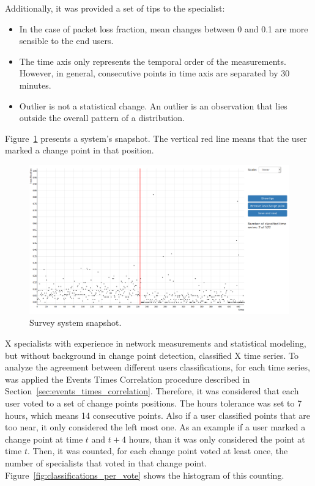 Additionally, it was provided a set of tips to the specialist:

\begin{itemize}
    \item In the case of packet loss fraction, mean changes between 0 and 0.1
    are more sensible to the end users.
    \item The time axis only represents the temporal order of the measurements.
    However, in general, consecutive points in time axis are separated by 30
    minutes.
    \item Outlier is not a statistical change. An outlier is an observation that
    lies outside the overall pattern of a distribution.
\end{itemize}

Figure~\ref{fig:survey_system} presents a system's snapshot.
The vertical red line means that the user marked a change point in that
position.

\begin{figure}[H]
    \centering
    \includegraphics[width=0.9\linewidth]{./figures/methodology/supervised_learning_try/survey_system.png}
    \caption{Survey system snapshot.}
\label{fig:survey_system}
\end{figure}%

X specialists with experience in network measurements and statistical
modeling, but without background in change point detection, classified X time
series.
To analyze the agreement between different users classifications,
for each time series, was applied the Events Times Correlation procedure
described in Section~\ref{sec:events_times_correlation}. Therefore, it was
considered that each user voted to a set of change points positions.
The hours tolerance was set to 7 hours, which means 14 consecutive points. Also
if a user classified points that are too near, it only considered the left most
one. As an example if a user marked a change point at time $t$ and $t + 4$
hours, than it was only considered the point at time $t$.
Then, it
was counted, for each change point voted at least once, the number of
specialists that voted in that change point.
Figure~\ref{fig:classifications_per_vote} shows the histogram of this counting.

